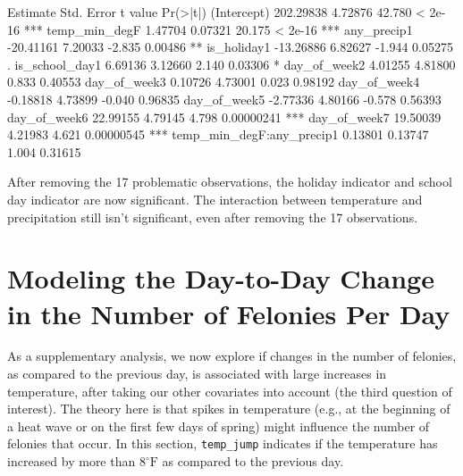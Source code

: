\documentclass[11pt,notitlepage]{article}
\newenvironment{codeSmall}%
   {\par\noindent\adjustbox{margin=1ex,bgcolor=shadecolor,margin=0ex \medskipamount}\bgroup\minipage\linewidth\verbatim\footnotesize}%
   {\endverbatim\endminipage\egroup}
\newcommand{\degf}{^\circ\text{F}}
\begin{document}
\begin{codeSmall}
                           Estimate Std. Error t value   Pr(>|t|)    
(Intercept)               202.29838    4.72876  42.780    < 2e-16 ***
temp_min_degF               1.47704    0.07321  20.175    < 2e-16 ***
any_precip1               -20.41161    7.20033  -2.835    0.00486 ** 
is_holiday1               -13.26886    6.82627  -1.944    0.05275 .  
is_school_day1              6.69136    3.12660   2.140    0.03306 *  
day_of_week2                4.01255    4.81800   0.833    0.40553    
day_of_week3                0.10726    4.73001   0.023    0.98192    
day_of_week4               -0.18818    4.73899  -0.040    0.96835    
day_of_week5               -2.77336    4.80166  -0.578    0.56393    
day_of_week6               22.99155    4.79145   4.798 0.00000241 ***
day_of_week7               19.50039    4.21983   4.621 0.00000545 ***
temp_min_degF:any_precip1   0.13801    0.13747   1.004    0.31615    
\end{codeSmall}



After removing the 17 problematic observations, the holiday indicator and school day indicator are now significant. The interaction between temperature and precipitation still isn't significant, even after removing the 17 observations. 






\section{Modeling the Day-to-Day Change in the Number of Felonies Per Day}

As a supplementary analysis, we now explore if changes in the number of felonies, as compared to the previous day, is associated with large increases in temperature, after taking our other covariates into account (the third question of interest). The theory here is that spikes in temperature (e.g., at the beginning of a heat wave or on the first few days of spring) might influence the number of felonies that occur. In this section, \texttt{temp_jump} indicates if the temperature has increased by more than $8\degf$ as compared to the previous day.
\end{document}
